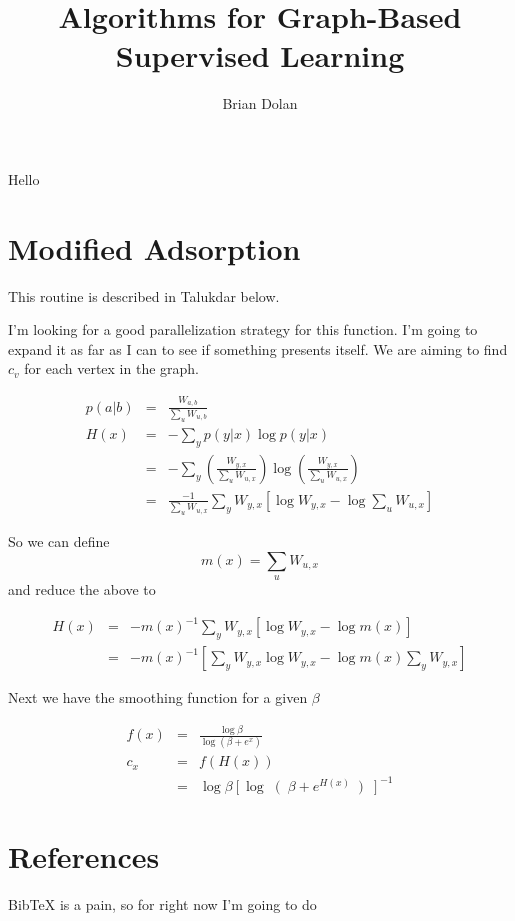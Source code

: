 \documentclass{article}
\begin{document}
\title{Algorithms for Graph-Based Supervised Learning}
\author{Brian Dolan}
\maketitle
Hello

\section{Modified Adsorption}

This routine is described in Talukdar below.

I'm looking for a good parallelization strategy for this function.  I'm going to expand it as far as I can to see if something presents itself.  We are aiming to find $c_v$ for each vertex in the graph.

\begin{eqnarray}
p(a|b) &=& \frac{W_{a,b}}{\sum_u W_{u,b}} \\
H(x) &=& -\sum_y p(y|x) \log p(y|x) \\
&=& -\sum _y \left( \frac{W_{y,x}} {\sum_u W_{u,x} } \right) \log \left(  \frac{W_{y,x}}{\sum_u W_{u,x} } \right) \\
&=& \frac{-1}{\sum_u W_{u,x} } \sum_y W_{y,x} \left[ \log W_{y,x} - \log \sum_u W_{u,x} \right]
\end{eqnarray}

So we can define $$m(x) = \sum_u W_{u,x}$$ and reduce the above to 

\begin{eqnarray}
H(x)  &=& -m(x)^{-1} \sum_y W_{y,x} \left[ \log W_{y,x} - \log m(x) \right] \\
  &=& -m(x)^{-1}  \left[  \sum_y W_{y,x} \log W_{y,x} -  \log m(x) \sum_y W_{y,x} \right] 
\end{eqnarray}

Next we have the smoothing function for a given $\beta$

\begin{eqnarray}
f(x) &=& \frac{\log \beta}{\log(\beta + e^{x})} \\ c_x &=& f(H(x)) \\
&=& \log \beta \left[ \log \right( \beta + e^{H(x)} \left)\right]^{-1}
\end{eqnarray}


\section{References}
BibTeX is a pain, so for right now I'm going to do
\end{document}
